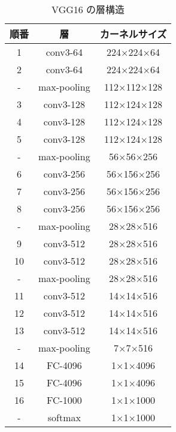 \begin{table}[!t]
  \begin{center}
  \caption{VGG16 の層構造}
  \begin{tabular}{|c|c|c|} \hline
    順番 & 層 & カーネルサイズ \\ \hline
    1 & conv3-64 & 224×224×64 \\ \hline
    2 & conv3-64 & 224×224×64 \\ \hline
    - & max-pooling & 112×112×128 \\ \hline
    3 & conv3-128 & 112×124×128 \\ \hline
    4 & conv3-128 & 112×124×128 \\ \hline
    5 & conv3-128 & 112×124×128 \\ \hline
    - & max-pooling & 56×56×256 \\ \hline
    6 & conv3-256 & 56×156×256 \\ \hline
    7 & conv3-256 & 56×156×256 \\ \hline
    8 & conv3-256 & 56×156×256 \\ \hline
    - & max-pooling & 28×28×516 \\ \hline
    9 & conv3-512 & 28×28×516 \\ \hline
    10 & conv3-512 & 28×28×516 \\ \hline
    - & max-pooling & 28×28×516 \\ \hline
    11 & conv3-512 & 14×14×516 \\ \hline
    12 & conv3-512 & 14×14×516 \\ \hline
    13 & conv3-512 & 14×14×516 \\ \hline
    - & max-pooling & 7×7×516 \\ \hline
    14 & FC-4096 & 1×1×4096 \\ \hline
    15 & FC-4096 & 1×1×4096 \\ \hline
    16 & FC-1000 & 1×1×1000 \\ \hline
    - & softmax & 1×1×1000 \\ \hline
  \end{tabular}
  \end{center}
\end{table}
